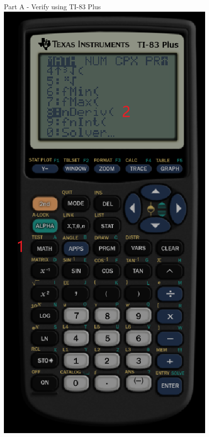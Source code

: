 \documentclass{beamer}
\begin{document}
\begin{frame}{Part A - Verify using TI-83 Plus}
    \includegraphics[scale=0.32]{2}

\end{frame}
\end{document}
